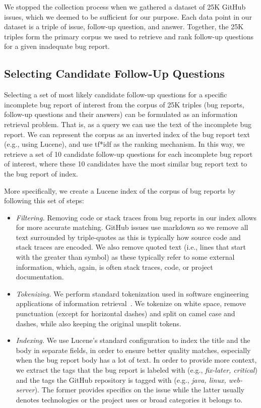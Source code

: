  We stopped the collection process when we gathered a dataset of 25K GitHub issues, which we deemed to be sufficient for our purpose. Each data point in our dataset is a triple of
issue, follow-up question, and answer. Together, the 25K triples form the primary corpus we used to
retrieve and rank follow-up questions for a given inadequate bug report.


\subsection{Selecting Candidate Follow-Up Questions}

Selecting a set of most likely candidate follow-up questions for a specific incomplete bug report of interest from the corpus
of 25K triples (bug reports, follow-up questions and their answers) can be formulated as an information retrieval
problem. That is, as a query we can use the text of the incomplete bug report. We can represent the corpus
as an inverted index of the bug report text (e.g., using Lucene), and use tf*idf as the
ranking mechanism. In this way, we retrieve a set of 10 candidate follow-up questions for each incomplete bug report
of interest, where these 10 candidates have the most similar bug report text to the bug report of index.

More specifically, we create a Lucene index of the corpus of bug reports by following this set of steps:
\begin{itemize}
\item {\em Filtering.} Removing code or stack traces from bug reports in our index allows
for more accurate matching. GitHub issues use markdown so we remove all text surrounded
by triple-quotes as this is typically how source code and stack traces are encoded. We also
remove quoted text (i.e., lines that start with the greater than symbol) as these typically
refer to some external information, which, again, is often stack traces, code, or project documentation.
\item {\em Tokenizing.} We perform standard tokenization used in software engineering applications
of information retrieval~\cite{marcus2004information,shepherd2012sando}. We tokenize on white space, remove
punctuation (except for horizontal dashes)
and split on camel case and dashes, while also keeping the original unsplit tokens.
\item {\em Indexing.} We use Lucene's standard configuration to index the title and the body in separate fields,
in order to ensure better quality matches, especially when the bug report body has a lot of text. In order to provide
more context, we extract the tags that the bug report is labeled with (e.g., {\em fix-later, critical}) and the tags the
GitHub repository is tagged with (e.g., {\em java, linux, web-server}). The former provides specifics on the issue while the
latter usually denotes technologies or the project uses or broad categories it belongs to.
\end{itemize}

